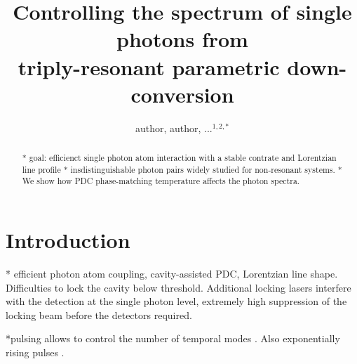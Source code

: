 \documentclass[aps,pra,showpacs,reprint,onecolumn,notitlepage]{revtex4-1}
\begin{document}
\title{Controlling the spectrum of single photons from\\ triply-resonant parametric down-conversion}
\author{author, author, ...$^{1,2,*}$}


\begin{abstract}
* goal: efficienct single photon atom interaction with a stable contrate and Lorentzian line profile 
* insdistinguishable photon pairs widely studied for non-resonant systems. 
* We show how PDC phase-matching temperature affects the photon spectra.
\end{abstract}

\maketitle 

\tableofcontents

\section{Introduction}
* efficient photon atom coupling, cavity-assisted PDC, Lorentzian line shape. Difficulties to lock the cavity below threshold. Additional locking lasers interfere with the detection at the single photon level, extremely high suppression of the locking beam before the detectors required.  

*pulsing allows to control the number of temporal modes \cite{Brecht2015}. Also exponentially rising pulses \cite{Sych2015}.
\end{document}
